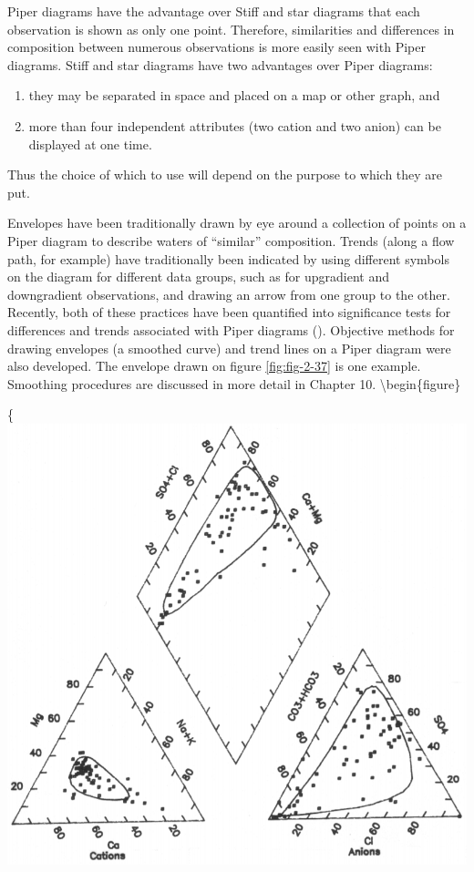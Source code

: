 \documentclass[]{book}
\providecommand{\tightlist}{%
  \setlength{\itemsep}{0pt}\setlength{\parskip}{0pt}}
\begin{document}
Piper diagrams have the advantage over Stiff and star diagrams that each observation is shown as only one point. Therefore, similarities and differences in composition between numerous observations is more easily seen with Piper diagrams. Stiff and star diagrams have two advantages over Piper diagrams:

\begin{enumerate}
\def\labelenumi{\arabic{enumi}.}
\tightlist
\item
  they may be separated in space and placed on a map or other graph, and
\item
  more than four independent attributes (two cation and two anion) can be displayed at one time.
\end{enumerate}

Thus the choice of which to use will depend on the purpose to which they are put.

Envelopes have been traditionally drawn by eye around a collection of points on a Piper diagram to describe waters of ``similar'' composition. Trends (along a flow path, for example) have traditionally been indicated by using different symbols on the diagram for different data groups, such as for upgradient and downgradient observations, and drawing an arrow from one group to the other. Recently, both of these practices have been quantified into significance tests for differences and trends associated with Piper diagrams (\citet{helsel_diamond_1992}). Objective methods for drawing envelopes (a smoothed curve) and trend lines on a Piper diagram were also developed. The envelope drawn on figure \ref{fig:fig-2-37} is one example. Smoothing procedures are discussed in more detail in Chapter 10.
\textbackslash{}begin\{figure\}

\{\centering \includegraphics[width=11.58in]{figures/2_37}
\end{document}
